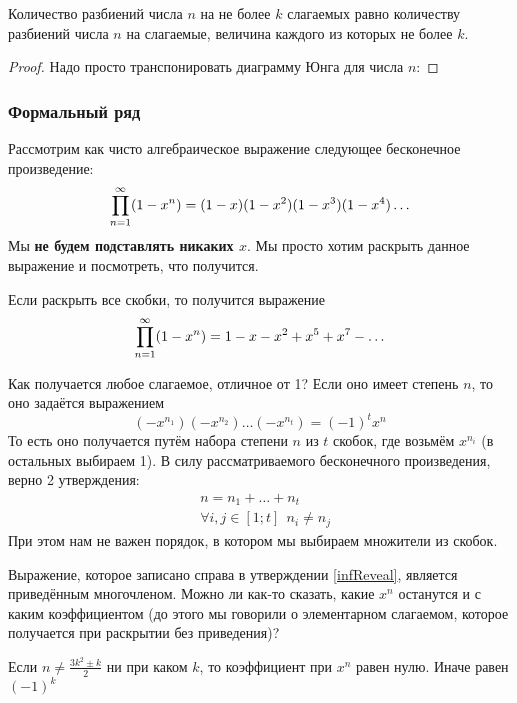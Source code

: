 \begin{theorem}
	Количество разбиений числа $n$ на не более $k$ слагаемых равно количеству разбиений числа $n$ на слагаемые, величина каждого из которых не более $k$.
\end{theorem}

\begin{proof}
	Надо просто транспонировать диаграмму Юнга для числа $n$:
\end{proof}

\subsubsection*{Формальный ряд}

Рассмотрим как чисто алгебраическое выражение следующее бесконечное произведение:
\[
	\prod\limits_{n = 1}^\infty (1 - x^n) = (1 - x)(1 - x^2)(1 - x^3)(1 - x^4)\ldots
\]
Мы \textbf{не будем подставлять никаких $x$}. Мы просто хотим раскрыть данное выражение и посмотреть, что получится.

\begin{proposition} \label{infReveal}
	Если раскрыть все скобки, то получится выражение
	\[
		\prod\limits_{n = 1}^\infty (1 - x^n) = 1 - x - x^2 + x^5 + x^ 7 - \ldots
	\]
\end{proposition}

Как получается любое слагаемое, отличное от 1? Если оно имеет степень $n$, то оно задаётся выражением
\[
	(-x^{n_1})(-x^{n_2})\ldots(-x^{n_t}) = (-1)^t x^n
\]
То есть оно получается путём набора степени $n$ из $t$ скобок, где возьмём $x^{n_i}$ (в остальных выбираем 1). В силу рассматриваемого бесконечного произведения, верно 2 утверждения:
\begin{align*}
	&n = n_1 + \ldots + n_t
	\\
	&\forall i, j \in [1; t]\ \ n_i \neq n_j
\end{align*}
При этом нам не важен порядок, в котором мы выбираем множители из скобок.

Выражение, которое записано справа в утверждении \ref{infReveal}, является приведённым многочленом. Можно ли как-то сказать, какие $x^n$ останутся и с каким коэффициентом (до этого мы говорили о элементарном слагаемом, которое получается при раскрытии без приведения)?

\begin{theorem}
	Если $n \neq \frac{3k^2 \pm k}{2}$ ни при каком $k$, то коэффициент при $x^n$ равен нулю. Иначе равен $(-1)^k$
\end{theorem}

